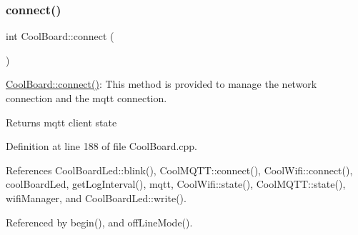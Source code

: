 \subsubsection{\texorpdfstring{connect()}{connect()}}
{\footnotesize\ttfamily int Cool\+Board\+::connect (\begin{DoxyParamCaption}{ }\end{DoxyParamCaption})}

\hyperlink{classCoolBoard_a519de78b807f8ec6463ff484eb925918}{Cool\+Board\+::connect()}\+: This method is provided to manage the network connection and the mqtt connection.

\begin{DoxyReturn}{Returns}
mqtt client state 
\end{DoxyReturn}


Definition at line 188 of file Cool\+Board.\+cpp.



References Cool\+Board\+Led\+::blink(), Cool\+M\+Q\+T\+T\+::connect(), Cool\+Wifi\+::connect(), cool\+Board\+Led, get\+Log\+Interval(), mqtt, Cool\+Wifi\+::state(), Cool\+M\+Q\+T\+T\+::state(), wifi\+Manager, and Cool\+Board\+Led\+::write().



Referenced by begin(), and off\+Line\+Mode().


